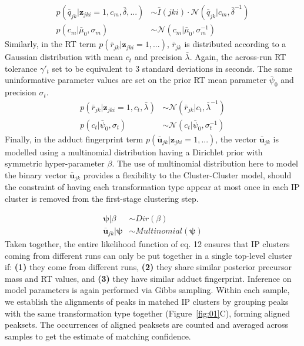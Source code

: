 \begin{align}
p({\bar{q}}_{jk}\vert\boldsymbol{z}_{jki}=1,c_m,\bar{\delta},...) &\sim \bar{I}(jki) \cdot \mathcal{N}(\bar{q}_{jk} \vert c_m,\bar{\delta}^{-1}) \\
p(c_m\vert \bar{\mu}_0,\sigma_m) &\sim \mathcal{N}(c_m \vert \bar{\mu}_0,\sigma_m^{-1})
\end{align}
Similarly, in the RT term $p({\bar{r}}_{jk}\vert\boldsymbol{z}_{jki}=1,...)$, ${\bar{r}}_{jk}$ is distributed according to a Gaussian distribution with mean $c_t$ and precision $\bar{\lambda}$. Again, the across-run RT tolerance $\gamma'_t$ set to be equivalent to 3 standard deviations in seconds. The same uninformative parameter values are set on the prior RT mean parameter $\bar{\psi}_0$ and precision $\sigma_t$.
\begin{align}
p({\bar{r}}_{jk}\vert\boldsymbol{z}_{jki}=1,c_t,\bar{\lambda}) &\sim \mathcal{N}({\bar{r}}_{jk} \vert c_t,\bar{\lambda}^{-1}) \\
p(c_t\vert \bar{\psi}_0,\sigma_t) &\sim \mathcal{N}(c_t \vert \bar{\psi}_0,\sigma_t^{-1})
\end{align}
Finally, in the adduct fingerprint term $p({\boldsymbol{\bar{u}}}_{jk}\vert\boldsymbol{z}_{jki}=1,...)$, the vector ${\boldsymbol{\bar{u}}}_{jk}$ is modelled using a multinomial distribution having a Dirichlet prior with symmetric hyper-parameter $\beta$.  The use of multinomial distribution here to model the binary vector ${\boldsymbol{\bar{u}}}_{jk}$ provides a flexibility to the Cluster-Cluster model, should the constraint of having each transformation type appear at most once in each IP cluster is removed from the first-stage clustering step.

\begin{align}
\boldsymbol{\psi}\vert\beta &\sim Dir(\beta) \\
{\boldsymbol{\bar{u}}}_{jk}\vert\boldsymbol{\psi} &\sim Multinomial(\boldsymbol{\psi})
\end{align}
Taken together, the entire likelihood function of eq. 12 ensures that IP clusters coming from different runs can only be put together in a single top-level cluster if: \textbf{(1)} they come from different runs, \textbf{(2)} they share similar posterior precursor mass and RT values, and \textbf{(3)} they have similar adduct fingerprint. Inference on model parameters is again performed via Gibbs sampling. Within each sample, we establish the alignments of peaks in matched IP clusters by grouping peaks with the same transformation type together (Figure~\ref{fig:01}C), forming aligned peaksets. The occurrences of aligned peaksets are counted and averaged across samples to get the estimate of matching confidence. 

